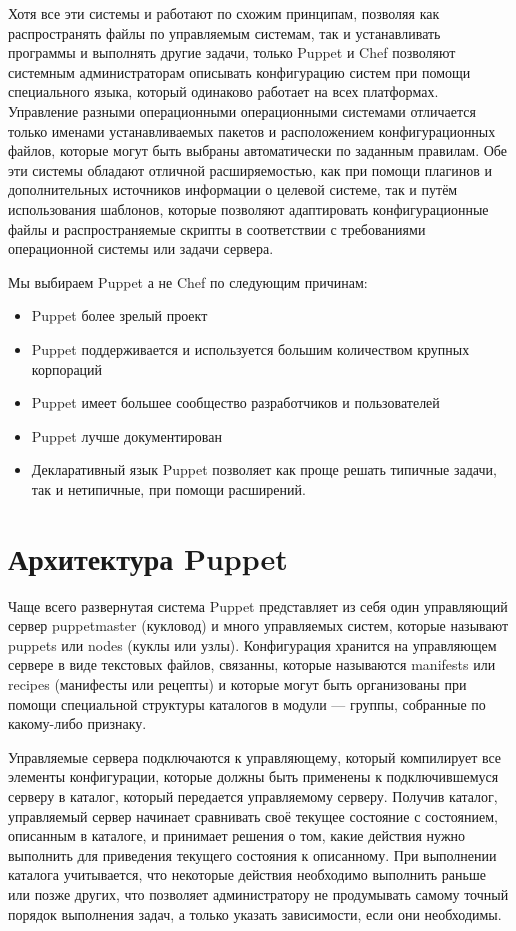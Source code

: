	Хотя все эти системы и работают по схожим принципам, позволяя как распространять файлы по управляемым системам, так и устанавливать программы и выполнять другие задачи, только Puppet и Chef позволяют системным администраторам описывать конфигурацию систем при помощи специального языка, который одинаково работает на всех платформах. Управление разными операционными операционными системами отличается только именами устанавливаемых пакетов и расположением конфигурационных файлов, которые могут быть выбраны автоматически по заданным правилам. Обе эти системы обладают отличной расширяемостью, как при помощи плагинов и дополнительных источников информации о целевой системе, так и путём использования шаблонов, которые позволяют адаптировать конфигурационные файлы и распространяемые скрипты в соответствии с требованиями операционной системы или задачи сервера.
	
	Мы выбираем Puppet а не Chef по следующим причинам:
\begin{itemize}
\item Puppet более зрелый проект
\item Puppet поддерживается и используется большим количеством крупных корпораций
\item Puppet имеет большее сообщество разработчиков и пользователей
\item Puppet лучше документирован
\item Декларативный язык Puppet позволяет как проще решать типичные задачи, так и нетипичные, при помощи расширений.
\end{itemize}

\section{Архитектура Puppet}

	Чаще всего развернутая система Puppet представляет из себя один управляющий сервер puppetmaster (кукловод) и много управляемых систем, которые называют puppets или nodes (куклы или узлы). Конфигурация хранится на управляющем сервере в виде текстовых файлов, связанны, которые называются manifests или recipes (манифесты или рецепты) и которые могут быть организованы при помощи специальной структуры каталогов в модули — группы, собранные по какому-либо признаку.
	
	Управляемые сервера подключаются к управляющему, который компилирует все элементы конфигурации, которые должны быть применены к подключившемуся серверу в каталог, который передается управляемому серверу. Получив каталог, управляемый сервер начинает сравнивать своё текущее состояние с состоянием, описанным в каталоге, и принимает решения о том, какие действия нужно выполнить для приведения текущего состояния к описанному. При выполнении каталога учитывается, что некоторые действия необходимо выполнить раньше или позже других, что позволяет администратору не продумывать самому точный порядок выполнения задач, а только указать зависимости, если они необходимы.  

